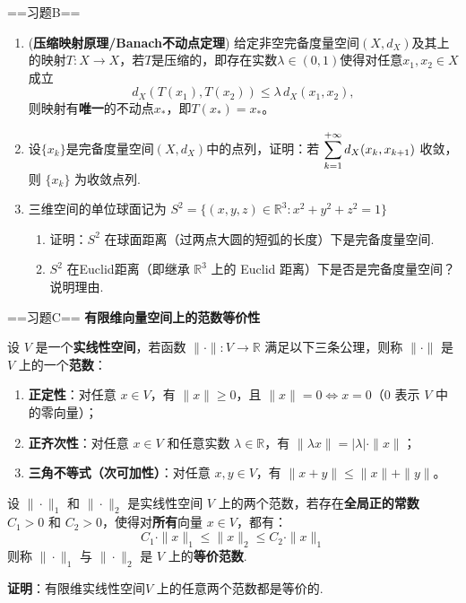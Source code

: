 ==习题B==
\begin{enumerate}     
    \item (\textbf{压缩映射原理/Banach不动点定理}) 给定非空完备度量空间$(X,d_X)$及其上的映射$T:X\to X$，若$T$是压缩的，即存在实数$\lambda \in (0,1)$使得对任意$x_1,x_2\in X$成立
    \[
    d_X(T(x_1), T(x_2)) \le \lambda\, d_X(x_1,x_2),
    \]
    则映射有\textbf{唯一}的不动点$x_*$，即$T(x_*) = x_*$。
    \item 设$\{x_k\}$是完备度量空间$(X,d_X)$中的点列，证明：若 $\displaystyle\sum_{k=1}^{+\infty} d_X (x_{k}, x_{k+1})$ 收敛，则 $\{x_k\}$ 为收敛点列.
    \item 三维空间的单位球面记为 $S^2=\{(x,y,z)\in\mathbb{R}^3:x^2+y^2+z^2=1\}$
    \begin{enumerate}  
    \item[(1)] 证明：$S^2$ 在球面距离（过两点大圆的短弧的长度）下是完备度量空间.
    \item[(2)] $S^2$ 在Euclid距离（即继承 $\mathbb{R}^3$ 上的 Euclid 距离）下是否是完备度量空间？说明理由.
    \end{enumerate}
\end{enumerate}

==习题C==
\textbf{有限维向量空间上的范数等价性}

设 \( V \) 是一个\textbf{实线性空间}，若函数 \( \|\cdot\|: V \to \mathbb{R} \) 满足以下三条公理，则称 \( \|\cdot\| \) 是 \( V \) 上的一个\textbf{范数}：
\begin{enumerate}
    \item[(a)] \textbf{正定性}：对任意 \( x \in V \)，有 \( \|x\| \geq 0 \)，且 \( \|x\| = 0 \iff x = 0 \)（\( 0 \) 表示 \( V \) 中的零向量）；
    \item[(b)] \textbf{正齐次性}：对任意 \( x \in V \) 和任意实数 \( \lambda \in \mathbb{R} \)，有 \( \|\lambda x\| = |\lambda| \cdot \|x\| \)；
    \item[(c)] \textbf{三角不等式（次可加性）}：对任意 \( x, y \in V \)，有 \( \|x + y\| \leq \|x\| + \|y\| \)。
\end{enumerate}

设 \( \|\cdot\|_1 \) 和 \( \|\cdot\|_2 \) 是实线性空间 \( V \) 上的两个范数，若存在\textbf{全局正的常数} \( C_1 > 0 \) 和 \( C_2 > 0 \)，使得对\textbf{所有}向量 \( x \in V \)，都有：
\[
C_1 \cdot \|x\|_1 \leq \|x\|_2 \leq C_2 \cdot \|x\|_1
\]
则称 \( \|\cdot\|_1 \) 与 \( \|\cdot\|_2 \) 是 \( V \) 上的\textbf{等价范数}.

\textbf{证明}：有限维实线性空间\( V \) 上的任意两个范数都是等价的.